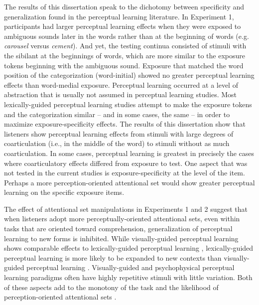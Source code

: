 The results of this dissertation speak to the dichotomy between specificity and generalization found in the perceptual learning literature. 
In Experiment 1, participants had larger perceptual learning effects when they were exposed to ambiguous sounds later in the words rather than at the beginning of words (e.g. \emph{carousel} versus \emph{cement}). 
And yet, the testing continua consisted of stimuli with the sibilant at the beginnings of words, which are more similar to the exposure tokens beginning with the ambiguous sound.
Exposure that matched the word position of the categorization (word-initial) showed no greater perceptual learning effects than word-medial exposure.
Perceptual learning occurred at a level of abstraction that is usually not assumed in perceptual learning studies.
Most lexically-guided perceptual learning studies attempt to make the exposure tokens and the categorization similar -- and in some cases, the same -- in order to maximize exposure-specificity effects.
The results of this dissertation show that listeners show perceptual learning effects from stimuli with large degrees of coarticulation (i.e., in the middle of the word) to stimuli without as much coarticulation. 
In some cases, perceptual learning is greatest in precisely the cases where coarticulatory effects differed from exposure to test.
One aspect that was not tested in the current studies is exposure-specificity at the level of the item.
Perhaps a more perception-oriented attentional set would show greater perceptual learning on the specific exposure items.

The effect of attentional set manipulations in Experiments 1 and 2 suggest that when listeners adopt more perceptually-oriented attentional sets, even within tasks that are oriented toward comprehension, generalization of perceptual learning to new forms is inhibited.
While visually-guided perceptual learning shows comparable effects to lexically-guided perceptual learning \citep{vanLinden2007}, lexically-guided perceptual learning is more likely to be expanded to new contexts  than visually-guided perceptual learning \citetext{\citealp{Norris2003, Kraljic2008a,Reinisch2014}, but see \citealp{Mitterer2013}}.
Visually-guided and psychophysical perceptual learning paradigms often have highly repetitive stimuli with little variation.  
Both of these aspects add to the monotony of the task and the likelihood of perception-oriented attentional sets \citep{Cutler1987}.

